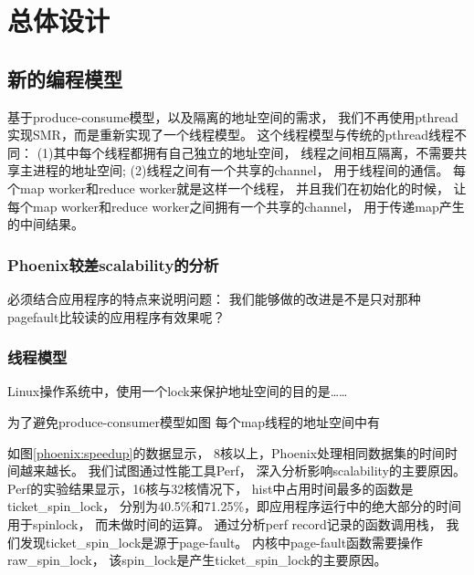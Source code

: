 \section{总体设计}
\subsection{新的编程模型}
基于produce-consume模型，以及隔离的地址空间的需求，
我们不再使用pthread实现SMR，而是重新实现了一个线程模型。
这个线程模型与传统的pthread线程不同：
(1)其中每个线程都拥有自己独立的地址空间，
线程之间相互隔离，不需要共享主进程的地址空间;
(2)线程之间有一个共享的channel，
用于线程间的通信。
每个map worker和reduce worker就是这样一个线程，
并且我们在初始化的时候，
让每个map worker和reduce worker之间拥有一个共享的channel，
用于传递map产生的中间结果。

\subsubsection{Phoenix较差scalability的分析}
必须结合应用程序的特点来说明问题：
我们能够做的改进是不是只对那种pagefault比较读的应用程序有效果呢？
\subsubsection{线程模型}
Linux操作系统中，使用一个lock来保护地址空间的目的是……

为了避免produce-consumer模型如图
每个map线程的地址空间中有


如图\ref{phoenix:speedup}的数据显示，
8核以上，Phoenix处理相同数据集的时间时间越来越长。
我们试图通过性能工具Perf\cite{}，
深入分析影响scalability的主要原因。
Perf的实验结果显示，16核与32核情况下，
hist中占用时间最多的函数是ticket\_spin\_lock，
分别为40.5\%和71.25\%，即应用程序运行中的绝大部分的时间用于spinlock，
而未做时间的运算。
通过分析perf record记录的函数调用栈，
我们发现ticket\_spin\_lock是源于page-fault。
内核中page-fault函数需要操作raw\_spin\_lock，
该spin\_lock是产生ticket\_spin\_lock的主要原因。

